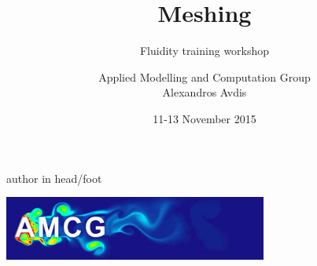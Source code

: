 \documentclass[t]{beamer}
\author[Alexandros Avdis]{Applied Modelling and Computation Group\\[15pt]Alexandros Avdis}
\institute{Department of Earth Science and Engineering, Imperial College London}
\date{11-13 November 2015}
\title[Meshing]{Meshing}
\subtitle[]{Fluidity training workshop}
\begin{document}
{
{%
\begin{beamercolorbox}[ht=.35cm,dp=0.2cm,wd=\textwidth,leftskip=.3cm]{author in head/foot}%
        \begin{minipage}[c]{5cm}%
        \end{minipage}\hfill%
        \begin{minipage}{6cm}
        \hfill\includegraphics[height=.5cm]{AMCGFlow-long}
        \end{minipage}
\end{beamercolorbox}%
}
\begin{frame}
\titlepage
\end{frame}
}
\end{document}
